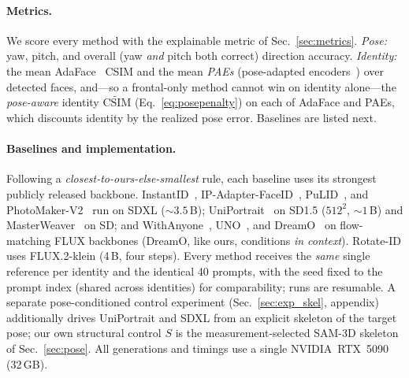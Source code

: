 \paragraph{Metrics.} We score every method with the explainable metric of
Sec.~\ref{sec:metrics}. \emph{Pose:} yaw, pitch, and overall (yaw \emph{and} pitch
both correct) direction accuracy. \emph{Identity:} the mean AdaFace~\cite{adaface}
CSIM and the mean \emph{PAEs} (pose-adapted encoders~\cite{pasl}) over detected
faces, and---so a frontal-only method cannot win on identity alone---the
\emph{pose-aware} identity $\widetilde{\mathrm{CSIM}}$ (Eq.~\ref{eq:posepenalty})
on each of AdaFace and PAEs, which discounts identity by the realized pose error.
Baselines are listed next.

\paragraph{Baselines and implementation.} Following a
\emph{closest-to-ours-else-smallest} rule, each baseline uses its strongest
publicly released backbone. InstantID~\cite{instantid},
IP-Adapter-FaceID~\cite{ipadapter}, PuLID~\cite{pulid}, and
PhotoMaker-V2~\cite{photomaker} run on SDXL ($\sim\!3.5$\,B);
UniPortrait~\cite{uniportrait} on SD1.5 ($512^2$, $\sim\!1$\,B) and
MasterWeaver~\cite{masterweaver} on SD; and WithAnyone~\cite{withanyone},
UNO~\cite{uno}, and DreamO~\cite{dreamo} on flow-matching FLUX backbones
(DreamO, like ours, conditions \emph{in context}).
Rotate-ID uses FLUX.2-klein (4\,B, four steps). Every method receives the
\emph{same} single reference per identity and the identical 40 prompts, with the
seed fixed to the prompt index (shared across identities) for comparability; runs
are resumable. A separate pose-conditioned control experiment
(Sec.~\ref{sec:exp_skel}, appendix) additionally drives UniPortrait and SDXL
from an explicit skeleton of the target pose; our own structural control $S$
is the measurement-selected SAM-3D skeleton of Sec.~\ref{sec:pose}. All
generations and timings use a single NVIDIA~RTX~5090 (32\,GB).

\FloatBarrier
